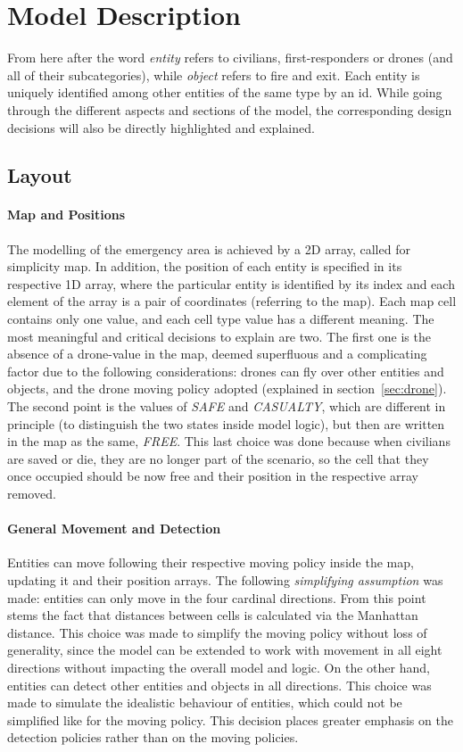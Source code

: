 
\section{Model Description}
From here after the word \textit{entity} refers to civilians, first-responders or drones (and all of their subcategories), while \textit{object} refers to fire and exit. Each entity is uniquely identified among other entities of the same type by an id. While going through the different aspects and sections of the model, the corresponding design decisions will also be directly highlighted and explained.


\subsection{Layout}
\paragraph{Map and Positions}
\label{sec:map}
The modelling of the emergency area is achieved by a 2D array, called for simplicity map. In addition, the position of each entity is specified in its respective 1D array, where the particular entity is identified by its index and each element of the array is a pair of coordinates (referring to the map).\newline
Each map cell contains only one value, and each cell type value has a different meaning. The most meaningful and critical decisions to explain are two. The first one is the absence of a drone-value in the map, deemed superfluous and a complicating factor due to the following considerations: drones can fly over other entities and objects, and the drone moving policy adopted (explained in section~\ref{sec:drone}). The second point is the values of \textit{SAFE} and \textit{CASUALTY}, which are different in principle (to distinguish the two states inside model logic), but then are written in the map as the same, \textit{FREE}. This last choice was done because when civilians are saved or die, they are no longer part of the scenario, so the cell that they once occupied should be now free and their position in the respective array removed.
\paragraph{General Movement and Detection}
Entities can move following their respective moving policy inside the map, updating it and their position arrays. The following \textit{simplifying assumption} was made: entities can only move in the four cardinal directions. From this point stems the fact that distances between cells is calculated via the Manhattan distance. This choice was made to simplify the moving policy without loss of generality, since the model can be extended to work with movement in all eight directions without impacting the overall model and logic. On the other hand, entities can detect other entities and objects in all directions. This choice was made to simulate the idealistic behaviour of entities, which could not be simplified like for the moving policy. This decision places greater emphasis on the detection policies rather than on the moving policies.


